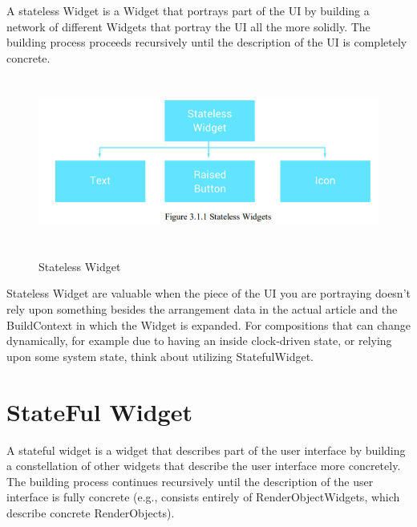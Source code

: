 A stateless Widget is a Widget that portrays part of the UI by building a network 
of different Widgets that portray the UI all the more solidly. The building process proceeds
recursively until the description of the UI is completely concrete.\\
\begin{figure}[h]
  \begin{center}
  \includegraphics[height=55mm]{Images & Logos/CH_03_STATELESS.png}\\
  \end{center}
  \caption{Stateless Widget}
\end{figure}  

Stateless Widget are valuable when the piece of the UI you are portraying doesn't rely upon something besides the arrangement data in the actual article and the BuildContext in which the Widget is expanded. For compositions that can change dynamically, for example due to having an inside clock-driven state, or relying upon some system state, think about utilizing StatefulWidget.\\

\section{StateFul Widget}
A stateful widget is a widget that describes part of the user interface by building a constellation of other widgets that describe the user interface more concretely. The building process continues recursively until the description of the user interface is fully concrete (e.g., consists entirely of RenderObjectWidgets, which describe concrete RenderObjects).\\

